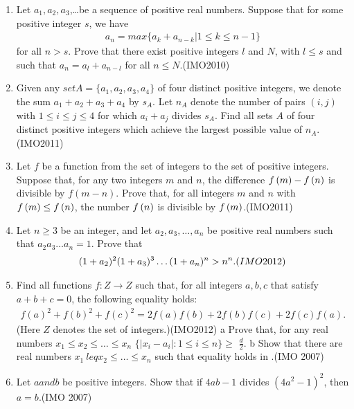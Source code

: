 \begin{enumerate}
			\item Let $a_{1}, a_{2}, a_{3}$,\dots be a sequence of positive real numbers. Suppose that for some positive integer $s$, we have
				\begin{align}
					a_{n}=max\{a_{k}+a_{n-k}\vert1\leq{k}\leq{n-1}\}
				\end{align}
				for all $n>s$. Prove that there exist positive integers $l$ and $N$, with $l\leq{s}$ and such that $a_{n}=a_{l}+a_{n-l}$ for all $n\leq{N}$.\hfill(IMO2010)
			\item Given any $setA=\{a_{1}, a_{2}, a_{3}, a_{4}\}$ of four distinct positive integers, we denote the sum $a_{1}+a_{2}+a_{3}+a_{4}$ by $s_{A}$. Let $n_{A}$ denote the number of pairs $ ( i, j) $ with $1\leq{i}\leq{j}\leq{4}$ for which $a_{i}+a_{j}$ divides $s_{A}$. Find all sets $A$ of four distinct positive integers which achieve the largest possible value of $n_{A}$.\hfill(IMO2011)
			\item  Let $f$ be a function from the set of integers to the set of positive integers. Suppose that, for any two integers $m$ and $n$, the difference $f\left(m\right) -f\left(n\right)$ is divisible by $f( m-n)$. Prove that, for all integers $m$ and $n$ with $f \left(m\right) \leq{f\ensuremath{\left(n\right)}}$, the number $f\left(n\right)$ is divisible by $f\left(m\right)$.\hfill(IMO2011)
			\item  Let $n\geq{3}$ be an integer, and let $a_{2}, a_{3},\dots, a_{n}$  be positive real numbers such that $a_{2}a_{3} \dots a_{n}=1$. Prove that
				\begin{align}
					(1+a_{2}) ^{2}  (1+a_{3}) ^{3} \dots (1+a_{n}) ^{n} > n^{n}.\hfill(IMO2012)
				\end{align}
			\item Find all functions $f:Z \rightarrow Z $ such that, for all integers $a, b, c$ that satisfy $a+b+c = 0$, the following equality holds:
				\begin{align}
					f(a)^2+f(b)^2+f(c)^2=2f(a)f(b)+2f(b)f(c)+2f(c)f(a).
				\end{align}
				(Here $Z$ denotes the set of integers.)\hfill(IMO2012)
				\brak a Prove that, for any real numbers $x_{1} \leq x_{2} \leq \dots \leq x_{n}$ 
	 $\{ | x_{i} - a_{i} | : 1 \leq  i \leq n \} \geq$  $\frac {d}{2}$. \brak *                                \brak b Show that there are real numbers $x_{1} \ leq x_{2} \leq \dots \leq x_{n}$ such that equality holds in \brak *.\hfill(IMO 2007)
\item Let $a and b$ be positive integers. Show that if     $4ab-1$ divides $(4a^2-1)^2$, then $a=b$.\hfill(IMO 2007)

\end{enumerate}
